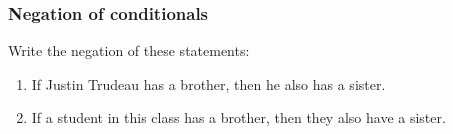 \documentclass[14pt]{beamer}
\begin{document}
	\begin{frame}
		\frametitle{Negation of conditionals}

		Write the negation of these statements:
		\begin{enumerate}
			\item If Justin Trudeau has a brother, then he also has a sister.

			\item If a student in this class has a brother, then they also have a
				sister.
		\end{enumerate}
	\end{frame}


\end{document}
